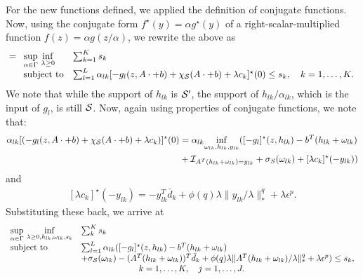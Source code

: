 For the new functions defined, we applied the definition of conjugate functions.
Now, using the conjugate form $f^\star(y) = \alpha g^\star(y)$ of a right-scalar-multiplied function $f(z) = \alpha g(z/\alpha)$, we rewrite the above as 
\begin{equation*}
	\begin{aligned}
&= \begin{array}[t]{ll}
	\underset{\alpha \in \Gamma}{\sup}~\underset{\lambda \geq 0}{\inf} &\sum_{k=1}^K s_k  \\
	\mbox{subject to}& \sum_{l=1}^L \alpha_{lk}[-g_l(z, A\cdot + b) +\chi_{\mathcal{S}}(A\cdot + b) + \lambda c_k]^\star(0) \le s_k, \quad k = 1,\dots,K.
\end{array}\\
\end{aligned}
\end{equation*}
We note that while the support of $h_{lk}$ is $\mathcal{S}'$, the support of $h_{lk}/\alpha_{lk}$, which is the input of $g_l$, is still $\mathcal{S}$.  Now, again using properties of conjugate functions, we note that:
\begin{equation*}
	\begin{aligned}
		\alpha_{lk}[(-g_l(z, A\cdot + b) +\chi_{\mathcal{S}}(A\cdot + b) + \lambda c_k)]^\star (0) &= \alpha_{lk}\underset{\omega_{lk}, h_{lk}, y_{lk}}{\inf} ([-g_l]^\star(z,h_{lk}) - b^T(h_{lk} + \omega_{lk})\\
  &+ \mathcal{I}_{A^T(h_{lk} + \omega_{lk})= y_{lk}} + \sigma_S(\omega_{lk})+[\lambda c_k]^\star (-y_{lk}))
	\end{aligned}
\end{equation*}
and
\begin{equation*}
\begin{aligned}
	[\lambda c_k]^\star (-y_{lk}) =-y_{lk}^T\bar{d}_k + \phi(q)\lambda {\|}y_{lk}/\lambda{\|}^q_* + \lambda \epsilon^p.
 \end{aligned}
\end{equation*}
Substituting these back, we arrive at
\begin{equation*}
	\begin{aligned}
\begin{array}[t]{ll}
	\underset{\alpha \in \Gamma}{\sup}~\underset{\lambda \geq 0, h_{lk},\omega_{lk}, s_k}{\inf} & \sum_k^K s_k\\
	\mbox{subject to} & \sum_{l=1}^L \alpha_{lk}([-g_l]^\star(z,h_{lk}) -b^T(h_{lk} + \omega_{lk})\\
	& + \sigma_{\mathcal{S}}(\omega_{lk}) - (A^T(h_{lk} + \omega_{lk}))^T \bar{d}_k + \phi(q)\lambda {\|}A^T(h_{lk} + \omega_{lk})/\lambda{\|}^q_* + \lambda \epsilon^p ) \le s_k, \\
	&\hspace{2cm} \quad k = 1,\dots,K, \quad j = 1,\dots,J.
\end{array}
\end{aligned}
\end{equation*}
